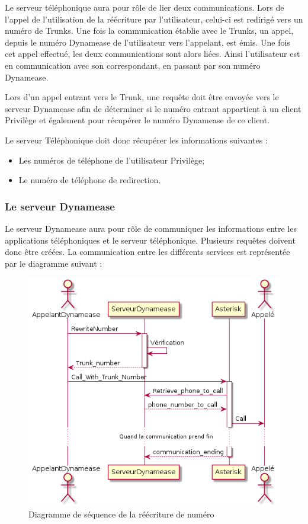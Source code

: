 Le serveur téléphonique aura pour rôle de lier deux communications. Lors de l'appel de l'utilisation de la réécriture par l'utilisateur, celui-ci est redirigé vers un numéro de Trunks. Une fois la communication établie avec le Trunks, un appel, depuis le numéro Dynamease de l'utilisateur vers l'appelant, est émis. Une fois cet appel effectué, les deux communications sont alors liées. Ainsi l'utilisateur est en communication avec son correspondant, en passant par son numéro Dynamease.

Lors d'un appel entrant vers le Trunk, une requête doit être envoyée vers le serveur Dynamease afin de déterminer si le numéro entrant appartient à un client Privilège et également pour récupérer le numéro Dynamease de ce client.

Le serveur Téléphonique doit donc récupérer les informations suivantes :

\begin{itemize}
	\item Les numéros de téléphone de l'utilisateur Privilège;
	\item Le numéro de téléphone de redirection.
\end{itemize}
 

\subsubsection{Le serveur Dynamease}

Le serveur Dynamease aura pour rôle de communiquer les informations entre les applications téléphoniques et le serveur téléphonique. Plusieurs requêtes doivent donc être créées. La communication entre les différents services est représentée par le diagramme suivant :\\

\begin{figure}[!h]
	\centering
	\includegraphics[scale=0.8]{img/sequence_rewirte.png}
	\caption{\label{sequence_rewirte} Diagramme de séquence de la réécriture de numéro}
\end{figure}

